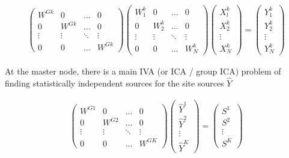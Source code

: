 \documentclass{amsproc}
\begin{document}
\begin{align} \label{site_specific}
    \begin{pmatrix}
        W^{Gk}  & 0         & \dots     & 0         \\
        0       & W^{Gk}    & \dots     & 0         \\
        \vdots  & \vdots    & \ddots    & \vdots    \\
        0       & 0         & \dots     & W^{Gk}
    \end{pmatrix}
    \begin{pmatrix}
        W^k_1   & 0         & \dots     & 0         \\
        0       & W^k_2     & \dots     & 0         \\
        \vdots  & \vdots    & \ddots    & \vdots    \\
        0       & 0         & \dots     & W^k_N
    \end{pmatrix}
    \begin{pmatrix}
        X^k_l   \\
        X^k_2   \\
        \vdots  \\
        X^k_N
    \end{pmatrix}
    =
    \begin{pmatrix}
        Y^k_1   \\
        Y^k_2   \\
        \vdots  \\
        Y^k_N
    \end{pmatrix}
\end{align} 

At the master node, there is a main IVA (or ICA / group ICA) problem of finding statistically independent sources for the site sources $\hat{Y}$
        
\begin{align} \label{global}
    \begin{pmatrix}
        W^{G1}  & 0         & \dots     & 0         \\
        0       & W^{G2}    & \dots     & 0         \\
        \vdots  & \vdots    & \ddots    & \vdots    \\
        0       & 0         & \dots     & W^{GK}
    \end{pmatrix}
    \begin{pmatrix}
        \hat{Y}^1   \\
        \hat{Y}^2   \\
        \vdots      \\
        \hat{Y}^K
    \end{pmatrix}
    =
    \begin{pmatrix}
        S^1     \\
        S^2     \\
        \vdots  \\
        S^K
    \end{pmatrix}
\end{align}
\end{document}

